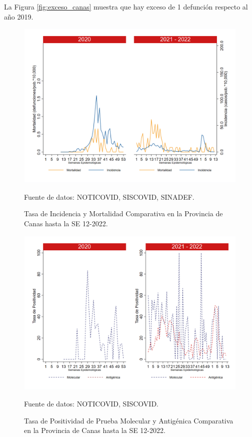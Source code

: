 \documentclass[12pt,a4paper,openany]{book}
\begin{document}
		La Figura \ref{fig:exceso_canas} muestra que hay exceso de 1 defunción respecto al año 2019.
		
		\begin{figure}[h]
			\caption{Tasa de Incidencia y Mortalidad Comparativa en la Provincia de Canas hasta la SE 12-2022.}\label{fig:inc_mort_canas}
			\begin{center}
				\includegraphics[width=0.85\linewidth]{../figuras/incidencia_mortalidad_20_21_3.png}
			\end{center}
			{\footnotesize {Fuente de datos: NOTICOVID, SISCOVID, SINADEF.}}
		\end{figure}
		
		\begin{figure}[h]
			\caption{Tasa de Positividad de Prueba Molecular y Antigénica Comparativa en la Provincia de Canas hasta la SE 12-2022.}\label{fig:positividad_canas}
			\begin{center}
				\includegraphics[width=0.7\linewidth]{../figuras/positividad_20_21_3.png}
			\end{center}
			{\footnotesize {Fuente de datos: NOTICOVID, SISCOVID.}}
		\end{figure}
		
\end{document}

